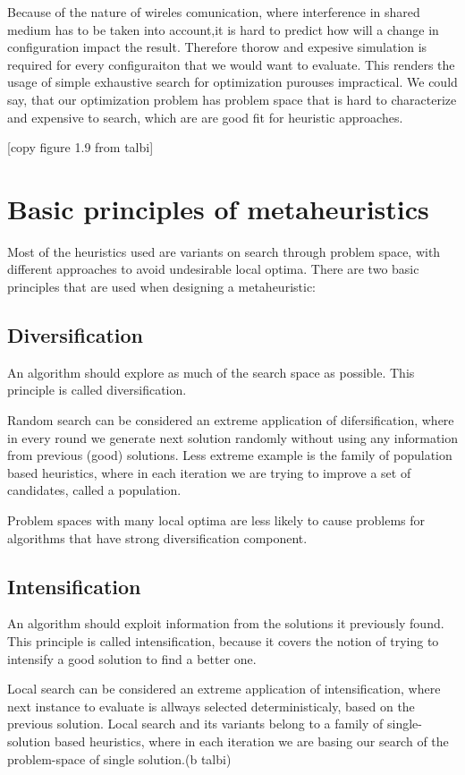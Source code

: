 \documentclass[12pt,oneside]{fithesis2}
\begin{document}
Because of the nature of wireles comunication, where interference in shared medium has to be taken into account,it is hard to predict how will a change in configuration impact the result. Therefore thorow and expesive simulation is required for every configuraiton that we would want to evaluate. This renders the usage of simple exhaustive search for optimization purouses impractical. We could say, that our optimization problem has problem space that is hard to characterize and expensive to search, which are are good fit for heuristic approaches\cite{talbi2009metaheuristics}.

[copy figure 1.9 from talbi]


\section{Basic principles of metaheuristics}

Most of the heuristics used are variants on search through problem space, with different approaches to avoid undesirable local optima.
There are two basic principles that are used when designing a metaheuristic:

\subsection{Diversification}
An algorithm should explore as much of the search space as possible. This principle is called diversification.

Random search can be considered an extreme application of difersification, where in every round we generate next solution randomly without using any information from previous (good) solutions. Less extreme example is the family of population based heuristics, where in each iteration we are trying to improve a set of candidates, called a population.

Problem spaces with many local optima are less likely to cause problems for algorithms that have strong diversification component.

\subsection{Intensification} 
An algorithm should exploit information from the solutions it previously found. This principle is called intensification, because it covers the notion of trying to intensify a good solution to find a better one.

Local search can be considered an extreme application of intensification, where next instance to evaluate is allways selected deterministicaly, based on the previous solution. Local search and its variants belong to a family of single-solution based heuristics, where in each iteration we are basing our search of the problem-space of single solution.(b talbi)
\end{document}
